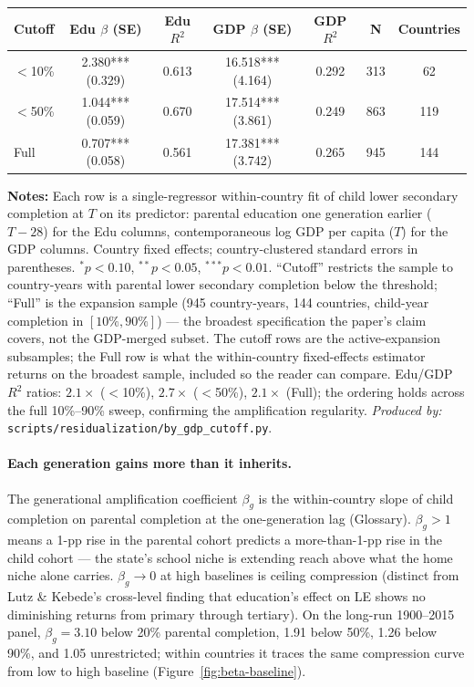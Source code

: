 \documentclass[12pt,letterpaper]{article}
\begin{document}
{\small\setlength{\tabcolsep}{4pt}
\begin{longtable}[]{@{}lcccccc@{}}
\toprule
Cutoff & Edu $\beta$ (SE) & Edu $R^2$ & GDP $\beta$ (SE) & GDP $R^2$ & N & Countries \\
\midrule
\endhead
$<$10\%  & 2.380*** (0.329) & 0.613 & 16.518*** (4.164) & 0.292 & 313  & 62  \\
$<$50\%  & 1.044*** (0.059) & 0.670 & 17.514*** (3.861) & 0.249 & 863  & 119 \\
Full     & 0.707*** (0.058) & 0.561 & 17.381*** (3.742) & 0.265 & 945 & 144 \\
\bottomrule
\end{longtable}}\addtocounter{table}{-1}%

\begin{minipage}{\dimexpr\textwidth-2em}
\scriptsize
\textbf{Notes:} Each row is a single-regressor within-country fit
of child lower secondary completion at $T$ on its predictor: parental
education one generation earlier ($T{-}28$) for the Edu columns,
contemporaneous log GDP per capita ($T$) for the GDP columns.
Country fixed effects; country-clustered standard
errors in parentheses. $^{*}p<0.10$, $^{**}p<0.05$, $^{***}p<0.01$.
``Cutoff'' restricts the sample to country-years with parental lower
secondary completion below the threshold; ``Full'' is the expansion
sample (945 country-years, 144 countries, child-year completion
in $[10\%, 90\%]$) --- the broadest specification the paper's claim
covers, not the GDP-merged subset.
The cutoff rows are the active-expansion subsamples; the Full row is
what the within-country fixed-effects estimator returns on the
broadest sample, included so the reader can compare. Edu/GDP $R^2$ ratios:
$2.1\times$ ($<$10\%), $2.7\times$ ($<$50\%), $2.1\times$ (Full); the
ordering holds across the full 10\%--90\% sweep, confirming the
amplification regularity.
\textit{Produced by:} \texttt{scripts/residualization/by\_gdp\_cutoff.py}.
\end{minipage}

\paragraph{Each generation gains more than it inherits.}
The generational amplification coefficient $\beta_g$ is the
within-country slope of child completion on parental completion at the
one-generation lag (Glossary). $\beta_g > 1$ means a 1-pp rise in the
parental cohort predicts a more-than-1-pp rise in the child cohort
--- the state's school niche is extending reach above what the home
niche alone carries. $\beta_g \to 0$ at high baselines is ceiling
compression (distinct from Lutz \& Kebede's cross-level finding that
education's effect on LE shows no diminishing returns from primary
through tertiary). On the long-run 1900--2015 panel, $\beta_g = 3.10$
below 20\% parental completion, 1.91 below 50\%, 1.26 below 90\%, and
1.05 unrestricted; within countries it traces the same compression
curve from low to high baseline (Figure~\ref{fig:beta-baseline}).
\end{document}
